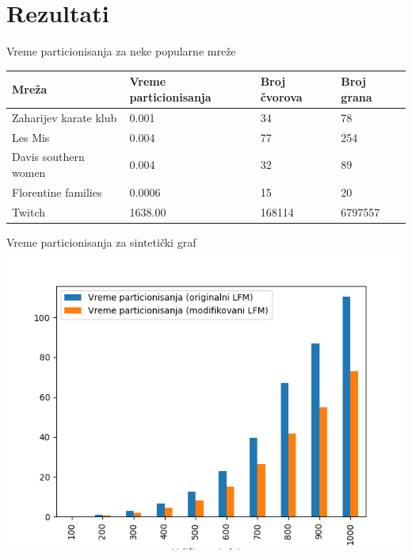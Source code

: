 \documentclass{beamer}
\begin{document}
\section{Rezultati}
\begin{frame}{Vreme particionisanja za neke popularne mreže}
    \centering
    \begin{table}
        \label{tab:4.2}
        \begin{tabular}{lp{1in}p{1in}p{0.5in}}
        Mreža & Vreme particionisanja & Broj čvorova & Broj grana \\
        \hline
        Zaharijev karate klub & 0.001 & 34 & 78 \\
        Les Mis & 0.004 & 77 & 254 \\
        Davis southern women & 0.004 & 32 & 89 \\
        Florentine families & 0.0006 & 15 & 20 \\
        Twitch  & 1638.00 & 168114 & 6797557 \\
    \end{tabular}
\end{table}
\end{frame}
    
\begin{frame}{Vreme particionisanja za sintetički graf}
    \centering
    \includegraphics[height=0.8\textheight]{csv/4.3.png}
\end{frame}
\end{document}
